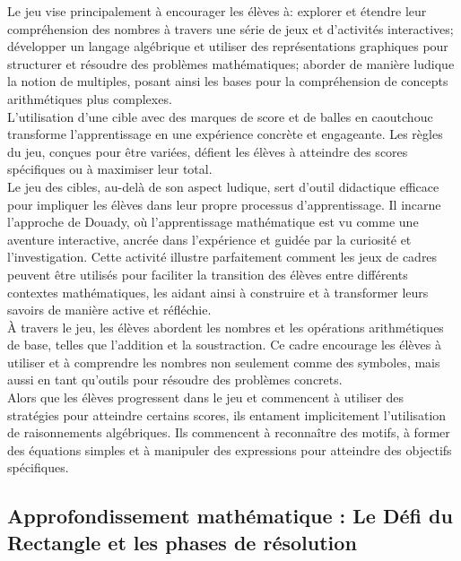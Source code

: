 Le jeu vise principalement à encourager les élèves à:
explorer et étendre leur compréhension des nombres à travers une série de jeux et d'activités interactives;
développer un langage algébrique et utiliser des représentations graphiques pour structurer et résoudre des problèmes mathématiques;
aborder de manière ludique la notion de multiples,
posant ainsi les bases pour la compréhension de concepts arithmétiques plus complexes.\\

L'utilisation d'une cible avec des marques de score et de balles en caoutchouc transforme l'apprentissage en une expérience concrète et engageante.
Les règles du jeu,
conçues pour être variées,
défient les élèves à atteindre des scores spécifiques ou à maximiser leur total.\\

Le jeu des cibles, au-delà de son aspect ludique,
sert d'outil didactique efficace pour impliquer les élèves dans leur propre processus d'apprentissage.
Il incarne l'approche de Douady,
où l'apprentissage mathématique est vu comme une aventure interactive,
ancrée dans l'expérience et guidée par la curiosité et l'investigation.
Cette activité illustre parfaitement comment les jeux de cadres peuvent être utilisés pour faciliter la transition des élèves entre différents contextes mathématiques,
les aidant ainsi à construire et à transformer leurs savoirs de manière active et réfléchie.\\

À travers le jeu,
les élèves abordent les nombres et les opérations arithmétiques de base,
telles que l'addition et la soustraction.
Ce cadre encourage les élèves à utiliser et à comprendre les nombres non seulement comme des symboles,
mais aussi en tant qu'outils pour résoudre des problèmes concrets.\\

Alors que les élèves progressent dans le jeu et commencent à utiliser des stratégies pour atteindre certains scores,
ils entament implicitement l'utilisation de raisonnements algébriques.
Ils commencent à reconnaître des motifs,
à former des équations simples et à manipuler des expressions pour atteindre des objectifs spécifiques.

\subsection{Approfondissement mathématique : Le Défi du Rectangle et les phases de résolution}

